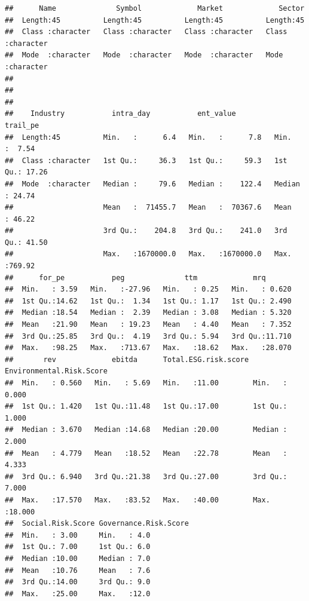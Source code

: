 \documentclass[
]{article}
\begin{document}
\begin{verbatim}
##      Name              Symbol             Market             Sector         
##  Length:45          Length:45          Length:45          Length:45         
##  Class :character   Class :character   Class :character   Class :character  
##  Mode  :character   Mode  :character   Mode  :character   Mode  :character  
##                                                                             
##                                                                             
##                                                                             
##    Industry           intra_day           ent_value            trail_pe     
##  Length:45          Min.   :      6.4   Min.   :      7.8   Min.   :  7.54  
##  Class :character   1st Qu.:     36.3   1st Qu.:     59.3   1st Qu.: 17.26  
##  Mode  :character   Median :     79.6   Median :    122.4   Median : 24.74  
##                     Mean   :  71455.7   Mean   :  70367.6   Mean   : 46.22  
##                     3rd Qu.:    204.8   3rd Qu.:    241.0   3rd Qu.: 41.50  
##                     Max.   :1670000.0   Max.   :1670000.0   Max.   :769.92  
##      for_pe           peg              ttm             mrq        
##  Min.   : 3.59   Min.   :-27.96   Min.   : 0.25   Min.   : 0.620  
##  1st Qu.:14.62   1st Qu.:  1.34   1st Qu.: 1.17   1st Qu.: 2.490  
##  Median :18.54   Median :  2.39   Median : 3.08   Median : 5.320  
##  Mean   :21.90   Mean   : 19.23   Mean   : 4.40   Mean   : 7.352  
##  3rd Qu.:25.85   3rd Qu.:  4.19   3rd Qu.: 5.94   3rd Qu.:11.710  
##  Max.   :98.25   Max.   :713.67   Max.   :18.62   Max.   :28.070  
##       rev             ebitda      Total.ESG.risk.score Environmental.Risk.Score
##  Min.   : 0.560   Min.   : 5.69   Min.   :11.00        Min.   : 0.000          
##  1st Qu.: 1.420   1st Qu.:11.48   1st Qu.:17.00        1st Qu.: 1.000          
##  Median : 3.670   Median :14.68   Median :20.00        Median : 2.000          
##  Mean   : 4.779   Mean   :18.52   Mean   :22.78        Mean   : 4.333          
##  3rd Qu.: 6.940   3rd Qu.:21.38   3rd Qu.:27.00        3rd Qu.: 7.000          
##  Max.   :17.570   Max.   :83.52   Max.   :40.00        Max.   :18.000          
##  Social.Risk.Score Governance.Risk.Score
##  Min.   : 3.00     Min.   : 4.0         
##  1st Qu.: 7.00     1st Qu.: 6.0         
##  Median :10.00     Median : 7.0         
##  Mean   :10.76     Mean   : 7.6         
##  3rd Qu.:14.00     3rd Qu.: 9.0         
##  Max.   :25.00     Max.   :12.0
\end{verbatim}
\end{document}
